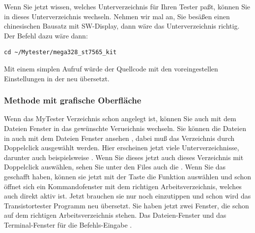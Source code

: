 Wenn Sie jetzt wissen, welches Unterverzeichnis für Ihren Tester paßt,
können Sie in dieses Unterverzeichnis wechseln.
Nehmen wir mal an, Sie besäßen einen chinesischen Bausatz mit SW-Display, 
dann wäre das Unterverzeichnis  richtig.
Der Befehl dazu wäre dann:
\begin{large} \vspace{-0.4em} \begin{verbatim}
cd ~/Mytester/mega328_st7565_kit
\end{verbatim} \end{large}
\vspace{-1em} 
Mit einem simplen  Aufruf würde der Quellcode mit
den voreingestellen Einstellungen in der  neu übersetzt.

\subsubsection{Methode mit grafische Oberfläche}
Wenn das MyTester Verzeichnis schon angelegt ist, können Sie auch mit
dem Dateien Fenster in das gewünschte Verueichnis wechseln.
Sie können die Dateien in  auch mit dem Dateien Fenster ansehen
, dabei muß das Verzeichnis  durch \LMB Doppelclick ausgewählt werden.
Hier erscheinen jetzt viele Unterverzeichnisse, darunter auch beispielsweise
.
Wenn Sie dieses jetzt auch dieses Verzeichnis mit \LMB Doppelclick auswählen,
sehen Sie unter den Files auch die .
Wenn Sie das geschafft haben, können sie jetzt mit der \RMB Taste die Funktion 
auswählen und schon öffnet sich ein Kommandofenster mit dem richtigen Arbeitsverzeichnis,
welches auch direkt aktiv ist. Jetzt brauchen sie nur noch  einzutippen und schon wird
das Transistortester Programm neu übersetzt.
Sie haben jetzt zwei Fenster, die schon auf dem richtigen Arbeitsverzeichnis stehen.
Das Dateien-Fenster und das Terminal-Fenster für die Befehls-Eingabe .

